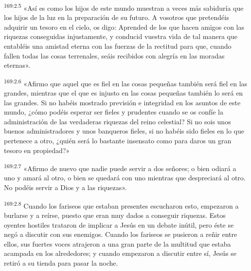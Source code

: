 \par 
\textsuperscript{169:2.5} «Así es como los hijos de este mundo muestran a veces más sabiduría que los hijos de la luz en la preparación de su futuro. A vosotros que pretendéis adquirir un tesoro en el cielo, os digo: Aprended de los que hacen amigos con las riquezas conseguidas injustamente, y conducid vuestra vida de tal manera que entabléis una amistad eterna con las fuerzas de la rectitud para que, cuando fallen todas las cosas terrenales, seáis recibidos con alegría en las moradas eternas».

\par 
\textsuperscript{169:2.6} «Afirmo que aquel que es fiel en las cosas pequeñas también será fiel en las grandes, mientras que el que es injusto en las cosas pequeñas también lo será en las grandes. Si no habéis mostrado previsión e integridad en los asuntos de este mundo, ¿cómo podéis esperar ser fieles y prudentes cuando se os confíe la administración de las verdaderas riquezas del reino celestial? Si no sois unos buenos administradores y unos banqueros fieles, si no habéis sido fieles en lo que pertenece a otro, ¿quién será lo bastante insensato como para daros un gran tesoro en propiedad?»

\par 
\textsuperscript{169:2.7} «Afirmo de nuevo que nadie puede servir a dos señores; o bien odiará a uno y amará al otro, o bien se quedará con uno mientras que despreciará al otro. No podéis servir a Dios y a las riquezas».

\par 
\textsuperscript{169:2.8} Cuando los fariseos que estaban presentes escucharon esto, empezaron a burlarse y a reírse, puesto que eran muy dados a conseguir riquezas. Estos oyentes hostiles trataron de implicar a Jesús en un debate inútil, pero éste se negó a discutir con sus enemigos. Cuando los fariseos se pusieron a reñir entre ellos, sus fuertes voces atrajeron a una gran parte de la multitud que estaba acampada en los alrededores; y cuando empezaron a discutir entre sí, Jesús se retiró a su tienda para pasar la noche.

